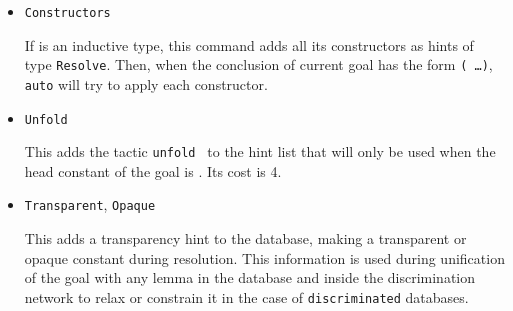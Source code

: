 \begin{coq_example*}
\begin{itemize}
\begin{Variants}
      Adds each \texttt{Immediate} {\term$_i$}.

  \end{Variants}

\item \texttt{Constructors} {\ident}

  If {\ident} is an inductive type, this command adds all its
  constructors as hints of type \texttt{Resolve}. Then, when the
  conclusion of current goal has the form \texttt{({\ident} \dots)},
  \texttt{auto} will try to apply each constructor.



\item \texttt{Unfold} {\qualid}

  This adds the tactic {\tt unfold {\qualid}} to the hint list that
  will only be used when the head constant of the goal is \ident.  Its
  cost is 4.


\item \texttt{Transparent}, \texttt{Opaque} {\qualid}
\label{HintTransparency}

  This adds a transparency hint to the database, making {\tt {\qualid}}
  a transparent or opaque constant during resolution. This information
  is used during unification of the goal with any lemma in the database
  and inside the discrimination network to relax or constrain it in the
  case of \texttt{discriminated} databases.


\end{itemize}
\end{coq_example*}
